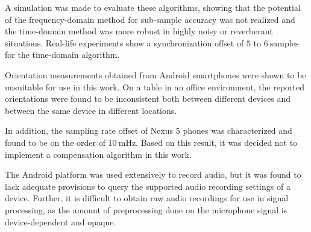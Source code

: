 \documentclass[a4paper, notitlepage]{report}
\begin{document}
A simulation was made to evaluate these algorithms, showing that the potential of the frequency-domain method for sub-sample accuracy was not realized and the time-domain method was more robust in highly noisy or reverberant situations. Real-life experiments show a synchronization offset of $5$ to $6~\mathrm{samples}$ for the time-domain algorithm.

Orientation measurements obtained from Android smartphones were shown to be unsuitable for use in this work. On a table in an office environment, the reported orientations were found to be inconsistent both between different devices and between the same device in different locations. 

In addition, the sampling rate offset of Nexus 5 phones was characterized and found to be on the order of $10~\mathrm{mHz}$. Based on this result, it was decided not to implement a compensation algorithm in this work. 

The Android platform was used extensively to record audio, but it was found to lack adequate provisions to query the supported audio recording settings of a device. Further, it is difficult to obtain raw audio recordings for use in signal processing, as the amount of preprocessing done on the microphone signal is device-dependent and opaque.
\end{document}
